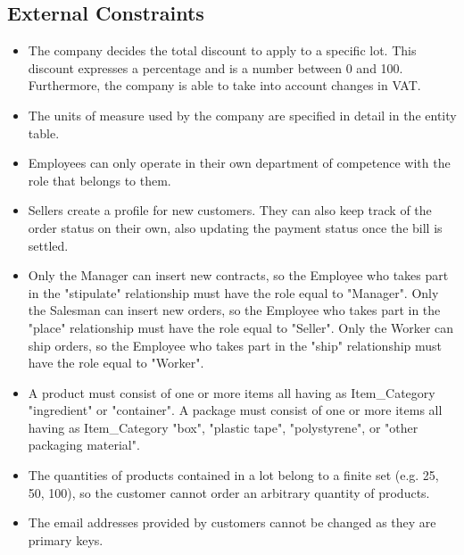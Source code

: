 \subsection{External Constraints}
\begin{itemize}
\item The company decides the total discount to apply to a specific lot. This discount expresses a percentage and is a number between 0 and 100. Furthermore, the company is able to take into account changes in VAT.
\item The units of measure used by the company are specified in detail in the entity table.
\item Employees can only operate in their own department of competence with the role that belongs to them.
\item Sellers create a profile for new customers. They can also keep track of the order status on their own, also updating the payment status once the bill is settled.
\item Only the Manager can insert new contracts, so the Employee who takes part in the "stipulate" relationship must have the role equal to "Manager". Only the Salesman can insert new orders, so the Employee who takes part in the "place" relationship must have the role equal to "Seller". Only the Worker can ship orders, so the Employee who takes part in the "ship" relationship must have the role equal to "Worker".
\item A product must consist of one or more items all having as Item_Category "ingredient" or "container". A package must consist of one or more items all having as Item_Category "box", "plastic tape", "polystyrene", or "other packaging material". %
\item The quantities of products contained in a lot belong to a finite set (e.g. 25, 50, 100), so the customer cannot order an arbitrary quantity of products.
\item The email addresses provided by customers cannot be changed as they are primary keys.
\end{itemize}